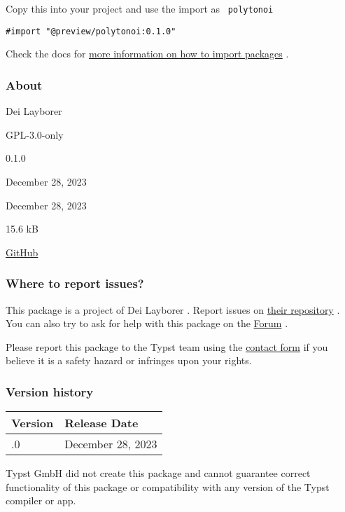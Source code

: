 Copy this into your project and use the import as \texttt{\ polytonoi\ }

\begin{verbatim}
#import "@preview/polytonoi:0.1.0"
\end{verbatim}



Check the docs for
\href{https://typst.app/docs/reference/scripting/\#packages}{more
information on how to import packages} .

\subsubsection{About}\label{about}

\begin{description}
\tightlist
\item[Author :]
Dei Layborer
\item[License:]
GPL-3.0-only
\item[Current version:]
0.1.0
\item[Last updated:]
December 28, 2023
\item[First released:]
December 28, 2023
\item[Archive size:]
15.6 kB
\href{https://packages.typst.org/preview/polytonoi-0.1.0.tar.gz}{\pandocbounded{}}
\item[Repository:]
\href{https://github.com/dei-layborer/polytonoi}{GitHub}
\end{description}

\subsubsection{Where to report issues?}\label{where-to-report-issues}

This package is a project of Dei Layborer . Report issues on
\href{https://github.com/dei-layborer/polytonoi}{their repository} . You
can also try to ask for help with this package on the
\href{https://forum.typst.app}{Forum} .

Please report this package to the Typst team using the
\href{https://typst.app/contact}{contact form} if you believe it is a
safety hazard or infringes upon your rights.

\label{versions}
\subsubsection{Version history}\label{version-history}

\begin{longtable}[]{@{}ll@{}}
\toprule\noalign{}
Version & Release Date \\
\midrule\noalign{}
\endhead
\bottomrule\noalign{}
\endlastfoot
0.1.0 & December 28, 2023 \\
\end{longtable}

Typst GmbH did not create this package and cannot guarantee correct
functionality of this package or compatibility with any version of the
Typst compiler or app.
